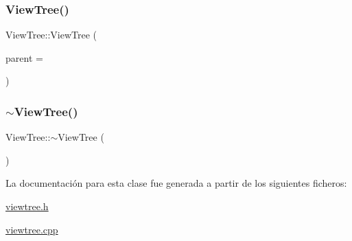 \subsubsection{\texorpdfstring{View\+Tree()}{ViewTree()}}
{\footnotesize\ttfamily View\+Tree\+::\+View\+Tree (\begin{DoxyParamCaption}\item[{Q\+Widget $\ast$}]{parent = {} }\end{DoxyParamCaption})\hspace{0.3cm}{\ttfamily [explicit]}}

\mbox{\label{class_view_tree_a0ad5e737640d9b992b39088dbfe9f291}} 
\subsubsection{\texorpdfstring{$\sim$\+View\+Tree()}{~ViewTree()}}
{\footnotesize\ttfamily View\+Tree\+::$\sim$\+View\+Tree (\begin{DoxyParamCaption}{ }\end{DoxyParamCaption})}



La documentación para esta clase fue generada a partir de los siguientes ficheros\+:\begin{DoxyCompactItemize}
\item 
\mbox{\hyperlink{viewtree_8h}{viewtree.\+h}}\item 
\mbox{\hyperlink{viewtree_8cpp}{viewtree.\+cpp}}\end{DoxyCompactItemize}
